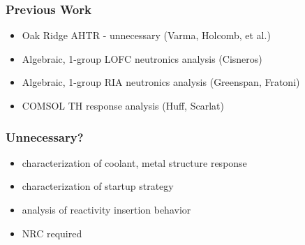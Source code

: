 \begin{frame}[fragile]
  \frametitle{Previous Work}
  \begin{itemize}
    \item Oak Ridge AHTR - unnecessary (Varma, Holcomb, et al.)
    \item Algebraic, 1-group LOFC neutronics analysis (Cisneros)
    \item Algebraic, 1-group RIA neutronics analysis (Greenspan, Fratoni)
    \item COMSOL TH response analysis (Huff, Scarlat)
  \end{itemize}

\end{frame}

\begin{frame}[fragile]
  \frametitle{Unnecessary?}
  \begin{itemize}
    \item characterization of coolant, metal structure response
    \item characterization of startup strategy
    \item analysis of reactivity insertion behavior
    \item NRC required
  \end{itemize}
\end{frame}


